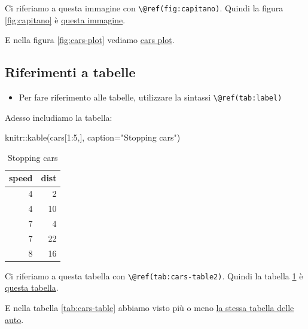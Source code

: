 \documentclass[a4paper, 11pt, nobind]{templates/ociamthesis}
\providecommand{\tightlist}{%
  \setlength{\itemsep}{0pt}\setlength{\parskip}{0pt}}
\newenvironment{Shaded}{\begin{snugshade}}{\end{snugshade}}
\newcommand{\AttributeTok}[1]{\textcolor[rgb]{0.77,0.63,0.00}{#1}}
\newcommand{\DecValTok}[1]{\textcolor[rgb]{0.00,0.00,0.81}{#1}}
\newcommand{\FunctionTok}[1]{\textcolor[rgb]{0.00,0.00,0.00}{#1}}
\newcommand{\NormalTok}[1]{#1}
\newcommand{\SpecialCharTok}[1]{\textcolor[rgb]{0.00,0.00,0.00}{#1}}
\newcommand{\StringTok}[1]{\textcolor[rgb]{0.31,0.60,0.02}{#1}}
\renewenvironment{Shaded}
{
  \vspace{10pt}%
  \begin{snugshade}%
}{%
  \end{snugshade}%
  \vspace{8pt}%
}
\begin{document}
Ci riferiamo a questa immagine con \texttt{\textbackslash{}@ref(fig:capitano)}.
Quindi la figura \ref{fig:capitano} è \protect\hyperlink{fig:capitano}{questa immagine}.

E nella figura \ref{fig:cars-plot} vediamo \protect\hyperlink{fig:cars-plot}{cars plot}.

\hypertarget{riferimenti-a-tabelle}{%
\subsection{Riferimenti a tabelle}\label{riferimenti-a-tabelle}}

\begin{itemize}
\tightlist
\item
  Per fare riferimento alle tabelle, utilizzare la sintassi \texttt{\textbackslash{}@ref(tab:label)}
\end{itemize}

Adesso includiamo la tabella:

\begin{Shaded}
\begin{Highlighting}[]
\NormalTok{knitr}\SpecialCharTok{::}\FunctionTok{kable}\NormalTok{(cars[}\DecValTok{1}\SpecialCharTok{:}\DecValTok{5}\NormalTok{,],}
            \AttributeTok{caption=}\StringTok{"Stopping cars"}\NormalTok{)}
\end{Highlighting}
\end{Shaded}

\begin{table}

\caption{\label{tab:cars-table2}Stopping cars}
\centering
\begin{tabular}[t]{r|r}
\hline
speed & dist\\
\hline
4 & 2\\
\hline
4 & 10\\
\hline
7 & 4\\
\hline
7 & 22\\
\hline
8 & 16\\
\hline
\end{tabular}
\end{table}

Ci riferiamo a questa tabella con \texttt{\textbackslash{}@ref(tab:cars-table2)}.
Quindi la tabella \ref{tab:cars-table2} è \protect\hyperlink{tab:cars-table2}{questa tabella}.

E nella tabella \ref{tab:cars-table} abbiamo visto più o meno \protect\hyperlink{tab:cars-table}{la stessa tabella delle auto}.
\end{document}
